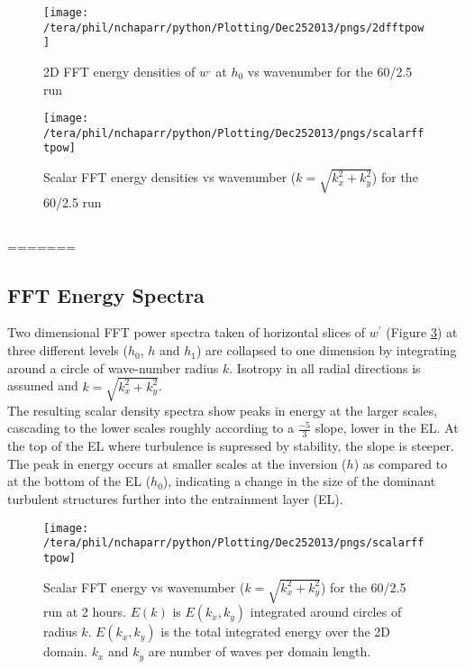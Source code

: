 \begin{figure}[htbp]
    \centering
    \texttt{[image: /tera/phil/nchaparr/python/Plotting/Dec252013/pngs/2dfftpow]}
    \caption{2D FFT energy densities of $w^{,}$ at $h_{0}$ vs wavenumber for the 60/2.5 run}
    \label{fig:scalardfftw602point5}   %
\end{figure}

\begin{figure}[htbp]
    \centering
    \texttt{[image: /tera/phil/nchaparr/python/Plotting/Dec252013/pngs/scalarfftpow]}
    \caption{Scalar FFT  energy densities vs wavenumber ($k = \sqrt{k_{x}^{2}+k_{y}^{2}}$) for the 60/2.5 run}
    \label{fig:2fftw602point5}   %
\end{figure}

\clearpage

\subsection{}%
=======
\subsection{FFT Energy Spectra}
\FloatBarrier

Two dimensional \acs{FFT} power spectra taken of horizontal slices of $w^{'}$ 
(Figure \ref{fig:2fftw602point5}) at three different levels ($h_{0}$, $h$ and $h_{1}$) are collapsed to 
one dimension by integrating around a circle of wave-number radius $k$.  Isotropy in all radial 
directions is assumed and $k = \sqrt{k_{x}^{2} + k_{y}^{2}}$.  \\

The resulting scalar density spectra show peaks in  energy at the larger scales, cascading to the lower 
scales roughly according to a $\frac{-5}{3}$ slope, lower in the \acs{EL}.  At the top of the \acs{EL} 
where turbulence is supressed by stability, the slope is steeper.  The peak in energy occurs at smaller 
scales at the inversion ($h$) as compared to at the bottom of the \acs{EL} ($h_{0}$), indicating a 
change in the size of the dominant turbulent structures further into the entrainment layer (\acs{EL}).\\

\begin{figure}[htbp]
    \centering
    \texttt{[image: /tera/phil/nchaparr/python/Plotting/Dec252013/pngs/scalarfftpow]}
    \caption{Scalar FFT  energy vs wavenumber ($k = \sqrt{k_{x}^{2}+k_{y}^{2}}$) for the 60/2.5 run
at 2 hours.  $E(k)$ is $E(k_{x}, k_{y})$ integrated around circles of radius $k$.  
   $E(k_{x}, k_{y})$ is the total integrated energy over the 2D domain.  
   $k_{x}$ and $k_{y}$ are number of waves per domain length.}
    \label{fig:2fftw602point5}   %
\end{figure}

